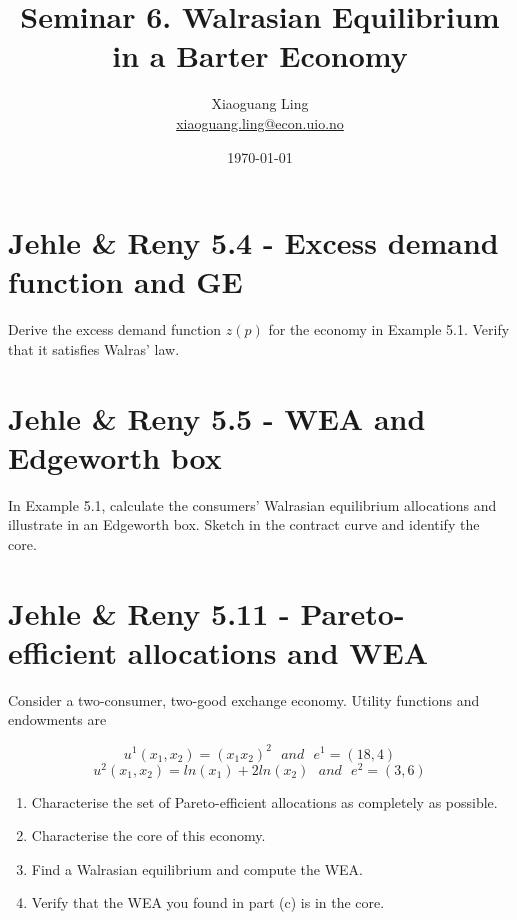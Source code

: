\documentclass{article}
\title{Seminar 6. Walrasian Equilibrium in a Barter Economy}
\author{Xiaoguang Ling \\  \href{xiaoguang.ling@econ.uio.no}{xiaoguang.ling@econ.uio.no}}
\date{\today}
\begin{document}
\maketitle



\section{Jehle \& Reny 5.4 - Excess demand function and GE}

Derive the excess demand function $z(p)$ for the economy in Example 5.1. Verify that it satisfies
Walras' law.


\section{Jehle \& Reny 5.5 - WEA and Edgeworth box}

In Example 5.1, calculate the consumers’ Walrasian equilibrium allocations and illustrate in an
Edgeworth box. Sketch in the contract curve and identify the core.
\section{Jehle \& Reny 5.11 - Pareto-efficient allocations and WEA}

Consider a two-consumer, two-good exchange economy. Utility functions and endowments are

$$u^1(x_1,x_2) = (x_1x_2)^2 \ \ \ and \ \ \  e^1 = (18,4)$$
$$u^2(x_1,x_2) = ln(x_1) + 2 ln(x_2) \ \ \ and \ \ \  e^2 = (3,6)$$

\begin{enumerate}
\item Characterise the set of Pareto-efficient allocations as completely as possible.
\item Characterise the core of this economy.
\item Find a Walrasian equilibrium and compute the WEA.
\item Verify that the WEA you found in part (c) is in the core.
\end{enumerate}
\end{document}
